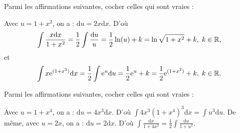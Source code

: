 \begin{question}
Parmi les affirmations suivantes, cocher celles qui sont vraies :
\begin{answers}  
\end{answers}
\begin{explanations}
Avec $u=1+x^2$, on a : $\mathrm{d}u=2x\mathrm{d}x$. D'où
$$\int \frac{x\mathrm{d}x}{1+x^2}=\frac{1}{2}\int \frac{\mathrm{d}u}{u}=\frac{1}{2}\ln (u)+k=\ln\sqrt{1+x^2}+k,\; k\in \mathbb{R},$$
et 
$$\int x\mathrm{e}^{(1+x^2)}\mathrm{d}x=\frac{1}{2}\int \mathrm{e}^u\mathrm{d}u=\frac{1}{2}\mathrm{e}^u+k=\frac{1}{2}\mathrm{e}^{(1+x^2)}+k,\; k\in \mathbb{R}.$$
\end{explanations}
\end{question}

\begin{question}
Parmi les affirmations suivantes, cocher celles qui sont vraies :
\begin{answers}  
\end{answers}
\vskip2mm
\begin{explanations}
Avec $u=1+x^4$, on a : $\mathrm{d}u=4x^3\mathrm{d}x$. D'où $\displaystyle \int 4x^3(1+x^4)^3\mathrm{d}x=\int u^3\mathrm{d}u$. De même, avec $u=2x$, on a : $\mathrm{d}u=2\mathrm{d}x$. D'où $\displaystyle \int \frac{\mathrm{d}x}{1+4x^2}=\frac{1}{2}\int \frac{\mathrm{d}u}{1+u^2}$.
\end{explanations}
\end{question}


